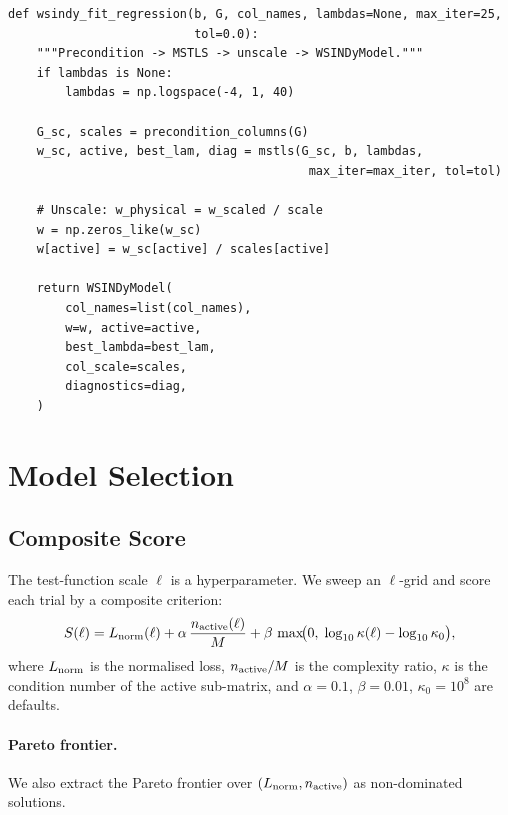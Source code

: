 \documentclass[11pt]{article}
\begin{document}
\begin{lstlisting}[caption={fit.py --- wsindy\_fit\_regression}]
def wsindy_fit_regression(b, G, col_names, lambdas=None, max_iter=25,
                          tol=0.0):
    """Precondition -> MSTLS -> unscale -> WSINDyModel."""
    if lambdas is None:
        lambdas = np.logspace(-4, 1, 40)

    G_sc, scales = precondition_columns(G)
    w_sc, active, best_lam, diag = mstls(G_sc, b, lambdas,
                                          max_iter=max_iter, tol=tol)

    # Unscale: w_physical = w_scaled / scale
    w = np.zeros_like(w_sc)
    w[active] = w_sc[active] / scales[active]

    return WSINDyModel(
        col_names=list(col_names),
        w=w, active=active,
        best_lambda=best_lam,
        col_scale=scales,
        diagnostics=diag,
    )
\end{lstlisting}


\section{Model Selection}
\label{sec:select}

\subsection{Composite Score}

The test-function scale $\ell$ is a hyperparameter.  We sweep an
$\ell$-grid and score each trial by a composite criterion:
\begin{equation}\label{eq:composite_score}
  S(\ell) = L_{\rm norm}(\ell)
  + \alpha\,\frac{n_{\rm active}(\ell)}{M}
  + \beta\,\max\!\bigl(0,\;\log_{10}\kappa(\ell) - \log_{10}\kappa_0\bigr),
\end{equation}
where $L_{\rm norm}$ is the normalised loss, $n_{\rm active}/M$ is the
complexity ratio, $\kappa$ is the condition number of the active
sub-matrix, and $\alpha = 0.1$, $\beta = 0.01$, $\kappa_0 = 10^8$ are
defaults.

\paragraph{Pareto frontier.}
We also extract the Pareto frontier over $(L_{\rm norm}, n_{\rm active})$
as non-dominated solutions.
\end{document}
